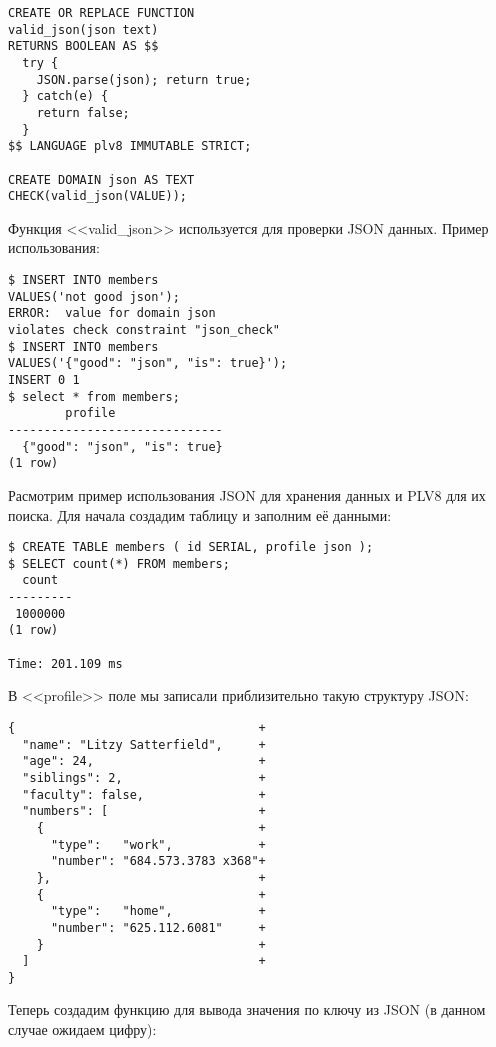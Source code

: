 \begin{lstlisting}[label=lst:plv8js7,caption=Создание типа JSON]
CREATE OR REPLACE FUNCTION 
valid_json(json text)
RETURNS BOOLEAN AS $$
  try { 
    JSON.parse(json); return true; 
  } catch(e) { 
    return false;
  }
$$ LANGUAGE plv8 IMMUTABLE STRICT;

CREATE DOMAIN json AS TEXT 
CHECK(valid_json(VALUE));
\end{lstlisting}

Функция <<valid\_json>> используется для проверки JSON данных. Пример использования:

\begin{lstlisting}[label=lst:plv8js8,caption=Проверка JSON]
$ INSERT INTO members 
VALUES('not good json');
ERROR:  value for domain json 
violates check constraint "json_check"
$ INSERT INTO members 
VALUES('{"good": "json", "is": true}');
INSERT 0 1
$ select * from members;
	    profile            
------------------------------
  {"good": "json", "is": true}
(1 row)
\end{lstlisting}

Расмотрим пример использования JSON для хранения данных и PLV8 для их поиска. Для начала создадим таблицу и заполним её данными:

\begin{lstlisting}[label=lst:plv8js9,caption=Таблица с JSON полем]
$ CREATE TABLE members ( id SERIAL, profile json );
$ SELECT count(*) FROM members;
  count  
---------
 1000000
(1 row)

Time: 201.109 ms
\end{lstlisting}

В <<profile>> поле мы записали приблизительно такую структуру JSON:

\begin{lstlisting}[label=lst:plv8js10,caption=JSON структура]
{                                  +
  "name": "Litzy Satterfield",     +
  "age": 24,                       +
  "siblings": 2,                   +
  "faculty": false,                +
  "numbers": [                     +
    {                              +
      "type":   "work",            +
      "number": "684.573.3783 x368"+
    },                             +
    {                              +
      "type":   "home",            +
      "number": "625.112.6081"     +
    }                              +
  ]                                +
}
\end{lstlisting}

Теперь создадим функцию для вывода значения по ключу из JSON (в данном случае ожидаем цифру):


